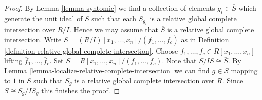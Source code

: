 \begin{proof}
By Lemma \ref{lemma-syntomic} we find a collection of elements
$\overline{g}_i \in \overline{S}$
which generate the unit ideal of $\overline{S}$
such that each $\overline{S}_{g_i}$ is a relative
global complete intersection over $R/I$.
Hence we may assume that $\overline{S}$ is a
relative global complete intersection.
Write
$\overline{S} =
(R/I)[x_1, \ldots, x_n]/(\overline{f}_1, \ldots, \overline{f}_c)$
as in Definition \ref{definition-relative-global-complete-intersection}.
Choose $f_1, \ldots, f_c \in R[x_1, \ldots, x_n]$
lifting $\overline{f}_1, \ldots, \overline{f}_c$.
Set $S = R[x_1, \ldots, x_n]/(f_1, \ldots, f_c)$.
Note that $S/IS \cong \overline{S}$.
By Lemma \ref{lemma-localize-relative-complete-intersection}
we can find $g \in S$ mapping to $1$ in $\overline{S}$ such
that $S_g$ is a relative global complete intersection over $R$.
Since $\overline{S} \cong S_g/IS_g$ this finishes the proof.
\end{proof}


